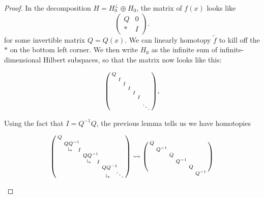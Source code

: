 \documentclass{shortart}
\theoremstyle{definition}
\newcommand\rotarrow{\begin{tikzpicture}\draw (0.15, 0) -- (0, 0) -- (0, 0.15); \draw (0.1, 0.05) -- (0.15, 0) -- (0.1, -0.05);\end{tikzpicture}}
\newcommand\id{I}
\newenvironment{psmallmatrix}
  {\left(\begin{smallmatrix}}
  {\end{smallmatrix}\right)}
\begin{document}
\begin{proof}
  In the decomposition $H = H_0^\perp \oplus H_0$, the matrix of $f(x)$ looks like
  \[
    \begin{pmatrix}
      Q & 0\\
      * & \id
    \end{pmatrix}.
  \]
  for some invertible matrix $Q = Q(x)$. We can linearly homotopy $\tilde{f}$ to kill off the $*$ on the bottom left corner. We then write $H_0$ as the infinite sum of infinite-dimensional Hilbert subspaces, so that the matrix now looks like this:
  \begin{useimager}
    \[
      \begin{psmallmatrix}
        Q \\
        & \id\\
        & & \id\\
        & & & \id\\
        & & & & \id\\
        & & & & & \id\\
        & & & & & & \ddots
      \end{psmallmatrix},
    \]
  \end{useimager}
  Using the fact that $\id =Q^{-1}Q$, the previous lemma tells us we have homotopies
  \begin{useimager}
    \[
      \begin{psmallmatrix}
        Q \\
        & QQ^{-1}\hspace{-5pt}\\
        & \rotarrow & \id\\
        & & & QQ^{-1}\hspace{-5pt}\\
        & & & \rotarrow & \id\\
        & & & & & QQ^{-1}\hspace{-5pt}\vspace{-5pt}\\
        & & & & & \rotarrow & \ddots
      \end{psmallmatrix}
      \rightsquigarrow
      \begin{psmallmatrix}
        Q \\
        & Q^{-1}\\
        & & Q\\
        & & & Q^{-1}\\
        & & & & Q\\
        & & & & & Q^{-1}\vspace{-5pt}\\

\end{psmallmatrix}\]
\end{useimager}
\end{proof}
\end{document}
